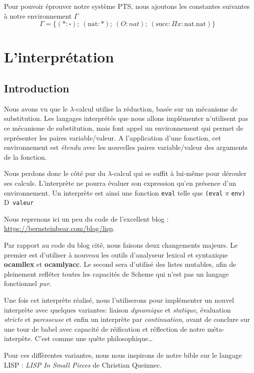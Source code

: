 \documentclass[11pt]{book}
\newcommand{\imp}{{\letterimp D}\hspace{0.1cm}}
\begin{document}
Pour pouvoir éprouver notre système PTS, nous ajoutons les constantes suivantes à notre environnement $\Gamma$
$$\Gamma = \{ (*:\square) ;\ (\text{nat}:*) ;\ (O:nat) ;\ (\text{succ}:\Pi x:\text{nat}.\text{nat}) \} $$
\chapter{L'interprétation}


\section{Introduction}
Nous avons vu que le $\lambda$-calcul utilise la réduction, basée sur un mécanisme de substitution.
Les langages interprétés que nous allons implémenter n'utilisent pas ce mécanisme de substitution, mais
font appel un environnement qui permet de représenter les paires variable/valeur.
A l'application d'une fonction, cet environnement est \textit{étendu} avec les nouvelles paires variable/valeur
des arguments de la fonction.

Nous perdons donc le côté  pur du $\lambda$-calcul qui se suffit à lui-même pour
dérouler ses calculs.
L'interprète ne pourra évaluer son expression qu'en présence d'un environnement.
Un interprète est ainsi  une fonction \verb+eval+ telle que \verb+(eval+ $\pi$ \verb+env)+ \imp\  \verb+valeur+


Nous reprenons ici  un peu du code de l'excellent blog :
\url{https://bernsteinbear.com/blog/lisp}.


Par rapport au code du blog cité, nous faisons deux changements majeurs. Le premier est d'utiliser à nouveau
les outils d'analyseur lexical et syntaxique \textbf{ocamllex} et \textbf{ocamlyacc}. 
Le second sera d'utilisé des listes mutables, afin de pleinement refléter toutes les capacités de Scheme qui n'est
pas un langage fonctionnel \textit{pur}.

Une fois cet interprète réalisé, nous l'utiliserons pour implémenter un nouvel interprète avec quelques variantes:
liaison \textit{dynamique} et \textit{statique}, évaluation \textit{stricte} et \textit{paresseuse} 
et enfin un interprète par \textit{continuation}, avant de conclure sur une tour de babel avec capacité de réification
et réflection de notre méta-interpète. C'est comme une quête philosophique\dots


Pour ces diffèrentes variantes, nous nous inspirons de notre bible sur le langage LISP : \textit{LISP In Small Pieces} de Christian Queinnec.
\cite{lisp}
\end{document}
